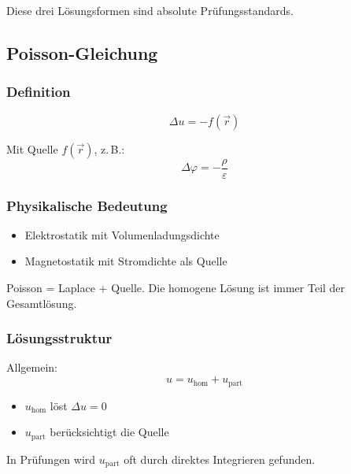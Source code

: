 \documentclass[a4paper]{article}
\newcommand{\eps}{\varepsilon}
\begin{document}
\begin{checkitem}
Diese drei Lösungsformen sind absolute Prüfungsstandards.
\end{checkitem}

\subsection{Poisson-Gleichung}

\subsubsection{Definition}

\[
\Delta u = -f(\vec r)
\]

Mit Quelle $f(\vec r)$, z.\,B.:
\[
\Delta \varphi = -\frac{\rho}{\eps}
\]

\subsubsection{Physikalische Bedeutung}

\begin{itemize}
  \item Elektrostatik mit Volumenladungsdichte
  \item Magnetostatik mit Stromdichte als Quelle
\end{itemize}

\begin{merke}
Poisson = Laplace + Quelle.
Die homogene Lösung ist immer Teil der Gesamtlösung.
\end{merke}

\subsubsection{Lösungsstruktur}

Allgemein:
\[
u = u_\text{hom} + u_\text{part}
\]

\begin{itemize}
  \item $u_\text{hom}$ löst $\Delta u = 0$
  \item $u_\text{part}$ berücksichtigt die Quelle
\end{itemize}

In Prüfungen wird $u_\text{part}$ oft durch direktes Integrieren gefunden.
\end{document}
